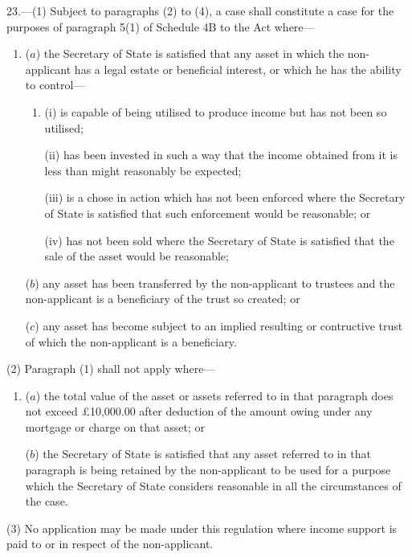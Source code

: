 \documentclass[a4paper]{article}
\begin{document}
23.—(1) Subject to paragraphs (2) to (4), a case shall constitute a case for the purposes of paragraph 5(1) of Schedule 4B to the Act where—
\begin{enumerate}\item[]
($a$) the Secretary of State is satisfied that any asset in which the non-applicant has a legal estate or beneficial interest, or which he has the ability to control—
\begin{enumerate}\item[]
(i) is capable of being utilised to produce income but has not been so utilised;

(ii) has been invested in such a way that the income obtained from it is less than might reasonably be expected;

(iii) is a chose in action which has not been enforced where the Secretary of State is satisfied that such enforcement would be reasonable; or

(iv) has not been sold where the Secretary of State is satisfied that the sale of the asset would be reasonable;
\end{enumerate}

($b$) any asset has been transferred by the non-applicant to trustees and the non-applicant is a beneficiary of the trust so created; or

($c$) any asset has become subject to an implied resulting or contructive trust of which the non-applicant is a beneficiary.
\end{enumerate}

(2) Paragraph (1) shall not apply where—
\begin{enumerate}\item[]
($a$) the total value of the asset or assets referred to in that paragraph does not exceed £10,000.00 after deduction of the amount owing under any mortgage or charge on that asset; or

($b$) the Secretary of State is satisfied that any asset referred to in that paragraph is being retained by the non-applicant to be used for a purpose which the Secretary of State considers reasonable in all the circumstances of the case.
\end{enumerate}

(3) No application may be made under this regulation where income support is paid to or in respect of the non-applicant.
\end{document}
